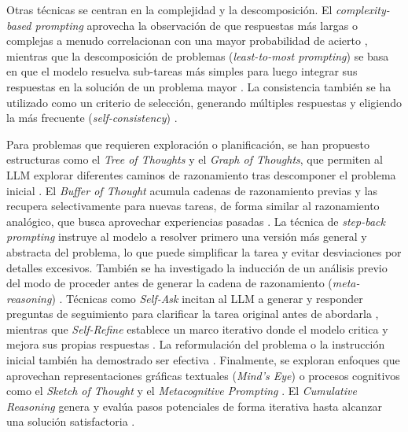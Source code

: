 Otras técnicas se centran en la complejidad y la descomposición. El \textit{complexity-based prompting} aprovecha la observación de que respuestas más largas o complejas a menudo correlacionan con una mayor probabilidad de acierto \parencite{fuComplexityBasedPromptingMultiStep2023}, mientras que la descomposición de problemas (\textit{least-to-most prompting}) se basa en que el modelo resuelva sub-tareas más simples para luego integrar sus respuestas en la solución de un problema mayor \parencite{zhouLeasttoMostPromptingEnables2023}. La consistencia también se ha utilizado como un criterio de selección, generando múltiples respuestas y eligiendo la más frecuente (\textit{self-consistency}) \parencite{wangSelfConsistencyImprovesChain2023}.

Para problemas que requieren exploración o planificación, se han propuesto estructuras como el \textit{Tree of Thoughts} y el \textit{Graph of Thoughts}, que permiten al LLM explorar diferentes caminos de razonamiento tras descomponer el problema inicial \parencite{yaoTreeThoughtsDeliberate2023, bestaGraphThoughtsSolving2024}. El \textit{Buffer of Thought} \parencite{yangBufferThoughtsThoughtAugmented2024} acumula cadenas de razonamiento previas y las recupera selectivamente para nuevas tareas, de forma similar al razonamiento analógico, que busca aprovechar experiencias pasadas \parencite{yasunagaLargeLanguageModels2024}. La técnica de \textit{step-back prompting}\parencite{zhengTakeStepBack2024} instruye al modelo a resolver primero una versión más general y abstracta del problema, lo que puede simplificar la tarea y evitar desviaciones por detalles excesivos. También se ha investigado la inducción de un análisis previo del modo de proceder antes de generar la cadena de razonamiento (\textit{meta-reasoning}) \parencite{gaoMetaReasoningLarge2024}. Técnicas como \textit{Self-Ask} incitan al LLM a generar y responder preguntas de seguimiento para clarificar la tarea original antes de abordarla \parencite{pressMeasuringNarrowingCompositionality2023}, mientras que \textit{Self-Refine} establece un marco iterativo donde el modelo critica y mejora sus propias respuestas \parencite{madaanSelfRefineIterativeRefinement2023}. La reformulación del problema o la instrucción inicial también ha demostrado ser efectiva \parencite{mishraReframingInstructionalPrompts2022, dengRephraseRespondLet2024}. Finalmente, se exploran enfoques que aprovechan representaciones gráficas textuales (\textit{Mind's Eye}) \parencite{wuMindsEyeLLMs} o procesos cognitivos como el \textit{Sketch of Thought} \parencite{aytesSketchofThoughtEfficientLLM2025} y el \textit{Metacognitive Prompting} \parencite{wangMetacognitivePromptingImproves2024}. El \textit{Cumulative Reasoning} genera y evalúa pasos potenciales de forma iterativa hasta alcanzar una solución satisfactoria \parencite{zhangCumulativeReasoningLarge2025}.

